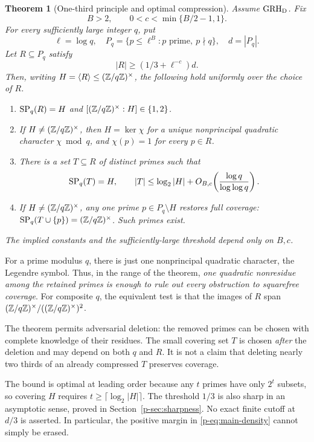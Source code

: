 \documentclass[11pt,a4paper]{article}
\newtheorem{theorem}{Theorem}[section]
\theoremstyle{definition}
\theoremstyle{remark}
\begin{document}
\begin{theorem}[One-third principle and optimal compression]\label{p-thm:main}
Assume $\mathrm{GRH}_{\mathrm D}$. Fix
\[
 B>2,\qquad 0<c<\min\{B/2-1,1\}.
\]
For every sufficiently large integer $q$, put
\[
 \ell=\log q,\quad
 P_q=\{p\le\ell^B:p\text{ prime},\ p\nmid q\},\quad d=|P_q|.
\]
Let $R\subseteq P_q$ satisfy
\begin{equation}\label{p-eq:main-density}
 |R|\ge(1/3+\ell^{-c})d.
\end{equation}
Then, writing $H=\langle R\rangle\le(\mathbb Z/q\mathbb Z)^\times$, the following hold uniformly
over the choice of $R$.
\begin{enumerate}[label=(\roman*),leftmargin=*,itemsep=4pt]
\item $\operatorname{SP}_q(R)=H$ and $[(\mathbb Z/q\mathbb Z)^\times:H]\in\{1,2\}$.
\item If $H\ne(\mathbb Z/q\mathbb Z)^\times$, then $H=\ker\chi$ for a unique nonprincipal
quadratic character $\chi\bmod q$, and $\chi(p)=1$ for every $p\in R$.
\item There is a set $T\subseteq R$ of distinct primes such that
\begin{equation}\label{p-eq:main-compression}
 \operatorname{SP}_q(T)=H,\qquad
 |T|\le\log_2|H|+
 O_{B,c}\!\left(\frac{\log q}{\log\log q}\right).
\end{equation}
\item If $H\ne(\mathbb Z/q\mathbb Z)^\times$, any one prime $p\in P_q\setminus H$ restores full
coverage: $\operatorname{SP}_q(T\cup\{p\})=(\mathbb Z/q\mathbb Z)^\times$. Such primes exist.
\end{enumerate}
The implied constants and the sufficiently-large threshold depend only
on $B,c$.
\end{theorem}

For a prime modulus $q$, there is just one nonprincipal quadratic
character, the Legendre symbol. Thus, in the range of the theorem,
\emph{one quadratic nonresidue among the retained primes is enough to
rule out every obstruction to squarefree coverage}. For composite $q$,
the equivalent test is that the images of $R$ span $(\mathbb Z/q\mathbb Z)^\times/((\mathbb Z/q\mathbb Z)^\times)^2$.

The theorem permits adversarial deletion: the removed primes can be
chosen with complete knowledge of their residues. The small covering
set $T$ is chosen \emph{after} the deletion and may depend on both $q$
and $R$. It is not a claim that deleting nearly two thirds of an already
compressed $T$ preserves coverage.

The bound is optimal at leading order because any $t$ primes have only
$2^t$ subsets, so covering $H$ requires
$t\ge\lceil\log_2|H|\rceil$. The threshold $1/3$ is also sharp in an
asymptotic sense, proved in Section~\ref{p-sec:sharpness}. No exact finite
cutoff at $d/3$ is asserted. In particular, the positive margin in
\eqref{p-eq:main-density} cannot simply be erased.
\end{document}

